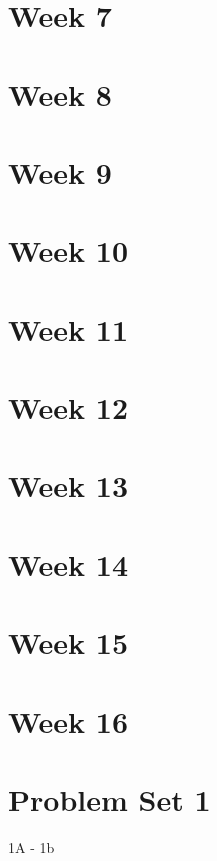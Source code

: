 \section{Week 7}
\section{Week 8}
\section{Week 9}
\section{Week 10}
\section{Week 11}
\section{Week 12}
\section{Week 13}
\section{Week 14}
\section{Week 15}
\section{Week 16}

\section{Problem Set 1}

\begin{problem}{1A - 1b}
\end{problem}
\begin{solution}
\end{solution}
